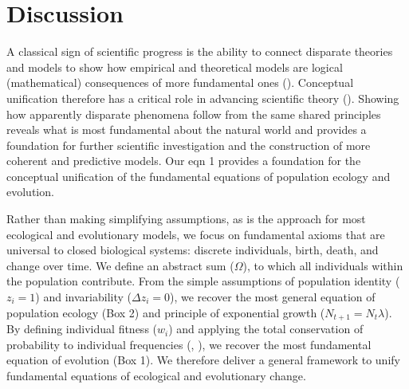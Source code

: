 \documentclass[
]{article}
\begin{document}
\section{Discussion}\label{discussion}

A classical sign of scientific progress is the ability to connect
disparate theories and models to show how empirical and theoretical
models are logical (mathematical) consequences of more fundamental ones
(). Conceptual unification therefore
has a critical role in advancing scientific theory
(). Showing how apparently
disparate phenomena follow from the same shared principles reveals what
is most fundamental about the natural world and provides a foundation
for further scientific investigation and the construction of more
coherent and predictive models. Our eqn 1 provides a foundation for the
conceptual unification of the fundamental equations of population
ecology and evolution.

Rather than making simplifying assumptions, as is the approach for most
ecological and evolutionary models, we focus on fundamental axioms that
are universal to closed biological systems: discrete individuals, birth,
death, and change over time. We define an abstract sum (\(\Omega\)), to
which all individuals within the population contribute. From the simple
assumptions of population identity (\(z_{i} = 1\)) and invariability
(\(\Delta z_{i} = 0\)), we recover the most general equation of
population ecology (Box 2) and principle of exponential growth
(\(N_{t+1} = N_{t}\lambda\)). By defining individual fitness (\(w_{i}\))
and applying the total conservation of probability to individual
frequencies (,
), we recover the most fundamental
equation of evolution (Box 1). We therefore deliver a general framework
to unify fundamental equations of ecological and evolutionary change.
\end{document}
